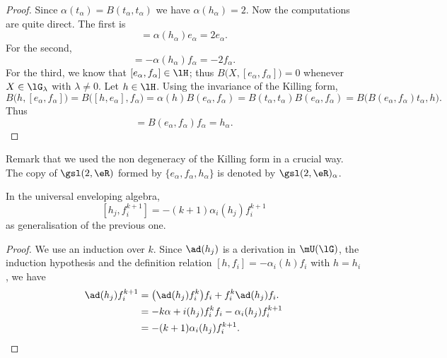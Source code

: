 \begin{proof}
    Since \( \alpha(t_{\alpha})=B(t_{\alpha},t_{\alpha})\) we have \( \alpha(h_{\alpha})=2\). Now the computations are quite direct. The first is
    \begin{equation}
        [h_{\alpha},e_{\alpha}]=\alpha(h_{\alpha})e_{\alpha}=2e_{\alpha}.
    \end{equation}
    For the second,
    \begin{equation}
        [h_{\alpha},f_{\alpha}]=-\alpha(h_{\alpha})f_{\alpha}=-2f_{\alpha}.
    \end{equation}
    For the third, we know that \( [e_{\alpha},f_{\alpha}]\in\lH\); thus \( B\big( X,[e_{\alpha},f_{\alpha}] \big)=0\) whenever \( X\in\lG_{\lambda}\) with \( \lambda\neq 0\). Let \( h\in\lH\). Using the invariance of the Killing form,
    \begin{equation}
        B\big( h,[e_{\alpha},f_{\alpha}] \big)=B\big( [h,e_{\alpha}],f_{\alpha} \big)=\alpha(h)B(e_{\alpha},f_{\alpha})=B(t_{\alpha},t_{\alpha})B(e_{\alpha},f_{\alpha})=B\big( B(e_{\alpha},f_{\alpha})t_{\alpha},h \big).
    \end{equation}
    Thus
    \begin{equation}
        [e_{\alpha},f_{\alpha}]=B(e_{\alpha},f_{\alpha})f_{\alpha}=h_{\alpha}.
    \end{equation}
\end{proof}
Remark that we used the non degeneracy of the Killing form in a crucial way. The copy of \( \gsl(2,\eR)\) formed by \( \{ e_{\alpha},f_{\alpha},h_{\alpha} \}\) is denoted by $\gsl(2,\eR)_{\alpha}$. 

\begin{proposition}
    In the universal enveloping algebra,
    \begin{equation}        \label{Eqhjfikplusun}
        [h_j,f_i^{k+1}]=-(k+1)\alpha_i(h_j)f_i^{k+1}
    \end{equation}
    as generalisation of the previous one.
\end{proposition}

\begin{proof}
    We use an induction over $k$. Since $\ad(h_j)$ is a derivation in $\mU(\lG)$, the induction hypothesis and the definition relation $[h,f_i]=-\alpha_i(h)f_i$ with $h=h_i$, we have
    \begin{equation}
        \begin{split}
            \ad(h_j)f^{k+1}_i   &=\big( \ad(h_j)f_i^k \big)f_i+f_i^k\ad(h_j)f_i.\\
                        &=-k\alpha+i(h_j)f_i^kf_i-\alpha_i(h_j)f^{k+1}_i\\
                        &=-(k+1)\alpha_i(h_j)f_i^{k+1}.
        \end{split}
    \end{equation}
\end{proof}

